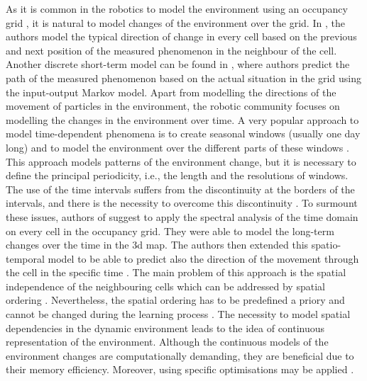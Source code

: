 As it is common in the robotics to model the environment using an occupancy grid \cite{elfes1989using}, it is natural to model changes of the environment over the grid.
In \cite{kucner2013conditional}, the authors model the typical direction of change in every cell based on the previous and next position of the measured phenomenon in the neighbour of the cell. 
Another discrete short-term model can be found in \cite{wang2014modeling}, where authors predict the path of the measured phenomenon based on the actual situation in the grid using the input-output Markov model.
Apart from modelling the directions of the movement of particles in the environment, the robotic community focuses on modelling the changes in the environment over time.
A very popular approach to model time-dependent phenomena is to create seasonal windows (usually one day long) and to model the environment over the different parts of these windows \cite{Van2008Using,Blanke2009Daily}.
This approach models patterns of the environment change, but it is necessary to define the principal periodicity, i.e., the length and the resolutions of windows.
The use of the time intervals suffers from the discontinuity at the borders of the intervals, and there is the necessity to overcome this discontinuity \cite{chinellato2017incremental}.
To surmount these issues, authors of \cite{krajnik2017fremen} suggest to apply the spectral analysis of the time domain on every cell in the occupancy grid. 
They were able to model the long-term changes over the time \cite{Krajnik2014Longterm} in the 3d map\cite{Krajnik2014Froctomap}.
The authors then extended this spatio-temporal model to be able to predict also the direction of the movement through the cell in the specific time \cite{molina2018modelling}.
The main problem of this approach is the spatial independence of the neighbouring cells which can be addressed by spatial ordering \cite{Cliff1975Model}.
Nevertheless, the spatial ordering has to be predefined a priory and cannot be changed during the learning process \cite{Shi2018Machine}.
The necessity to model spatial dependencies in the dynamic environment leads to the idea of continuous representation of the environment.
Although the continuous models of the environment changes are computationally demanding, they are beneficial due to their memory efficiency\cite{o2012gaussian,Vintr2019Spatio}.
Moreover, using specific optimisations may be applied \cite{ramos2016hilbert}.

